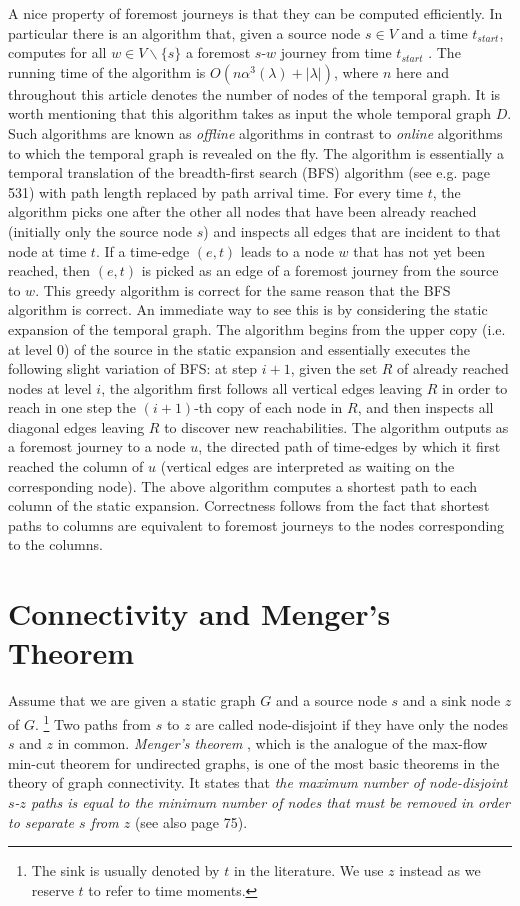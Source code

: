 \documentclass[oribibl, 11pt]{llncs}
\newcommand{\bs}{\backslash}
\begin{document}
A nice property of foremost journeys is that they can be computed efficiently. In particular there is an algorithm that, given a source node $s\in V$ and a time $t_{start}$, computes for all $w\in V\bs\{s\}$ a foremost $s$-$w$ journey from time $t_{start}$ \cite{MMCS13,MMS15}. The running time of the algorithm is $O(n\alpha^3(\lambda)+|\lambda|)$, where $n$ here and throughout this article denotes the number of nodes of the temporal graph. It is worth mentioning that this algorithm takes as input the whole temporal graph $D$. Such algorithms are known as \emph{offline} algorithms in contrast to \emph{online} algorithms to which the temporal graph is revealed on the fly. The algorithm is essentially a temporal translation of the breadth-first search (BFS) algorithm (see e.g. \cite{CLRS01} page 531) with path length replaced by path arrival time. For every time $t$, the algorithm picks one after the other all nodes that have been already reached (initially only the source node $s$) and inspects all edges that are incident to that node at time $t$. If a time-edge $(e,t)$ leads to a node $w$ that has not yet been reached, then $(e,t)$ is picked as an edge of a foremost journey from the source to $w$. This greedy algorithm is correct for the same reason that the BFS algorithm is correct. An immediate way to see this is by considering the static expansion of the temporal graph. The algorithm begins from the upper copy (i.e. at level 0) of the source in the static expansion and essentially executes the following slight variation of BFS: at step $i+1$, given the set $R$ of already reached nodes at level $i$, the algorithm first follows all vertical edges leaving $R$ in order to reach in one step the $(i+1)$-th copy of each node in $R$, and then inspects all diagonal edges leaving $R$ to discover new reachabilities. The algorithm outputs as a foremost journey to a node $u$, the directed path of time-edges by which it first reached the column of $u$ (vertical edges are interpreted as waiting on the corresponding node). The above algorithm computes a shortest path to each column of the static expansion. Correctness follows from the fact that shortest paths to columns are equivalent to foremost journeys to the nodes corresponding to the columns.

\section{Connectivity and Menger's Theorem}
\label{sec:menger}

Assume that we are given a static graph $G$ and a source node $s$ and a sink node $z$ of $G$. \footnote{The sink is usually denoted by $t$ in the literature. We use $z$ instead as we reserve $t$ to refer to time moments.} Two paths from $s$ to $z$ are called node-disjoint if they have only the nodes $s$ and $z$ in common. \emph{Menger's theorem} \cite{Me27}, which is the analogue of the max-flow min-cut theorem for undirected graphs, is one of the most basic theorems in the theory of graph connectivity. It states that \emph{the maximum number of node-disjoint $s$-$z$ paths is equal to the minimum number of nodes that must be removed in order to separate $s$ from $z$} (see also \cite{Bo98} page 75). 
\end{document}
